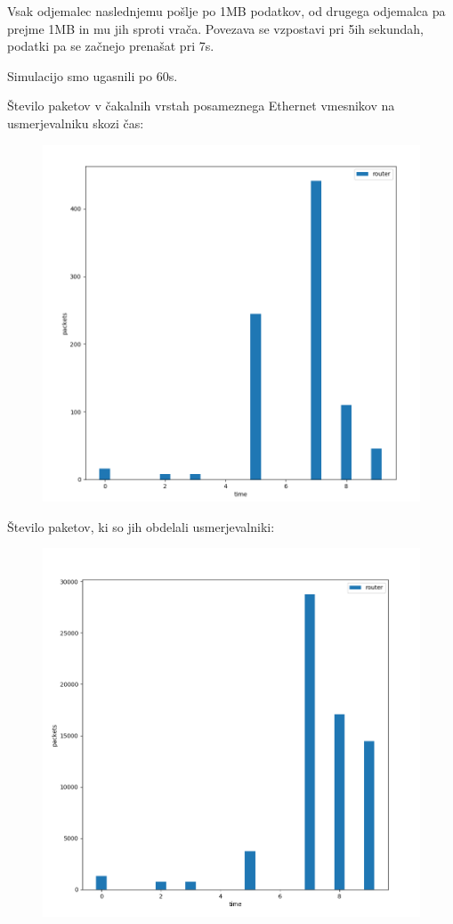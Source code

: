 \documentclass[11pt,a4paper,slovene]{myarticle}
\begin{document}
Vsak odjemalec naslednjemu pošlje po 1MB podatkov, od drugega odjemalca pa prejme 1MB in mu jih sproti vrača. Povezava se vzpostavi pri 5ih sekundah, podatki pa se začnejo prenašat pri 7s.

Simulacijo smo ugasnili po 60s.

Število paketov v čakalnih vrstah posameznega Ethernet vmesnikov na usmerjevalniku skozi čas:
\begin{figure}[h]
  \includegraphics[width=\linewidth]{queuelength-3.png}
\end{figure}

\pagebreak

Število paketov, ki so jih obdelali usmerjevalniki:
\begin{figure}[h]
  \includegraphics[width=\linewidth]{packets-3.png}
\end{figure}
\end{document}
